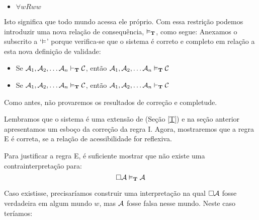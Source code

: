 \begin{itemize}
	\item $\forall wRww$
\end{itemize}
Isto significa que todo mundo acessa ele próprio.  Com   essa restrição podemos introduzir uma nova relação de consequência, $\vDash_{\mathbf{T}}$, como segue:
Anexamos o subscrito \mlT{}  a `$\vDash$' porque verifica-se que o sistema \mlT{} é correto e completo em relação a esta nova definição de validade:
\begin{itemize}
	\item Se $\mathcal{A}_1,\mathcal{A}_2, \dots \mathcal{A}_n\vdash_{\mathbf{T}}\mathcal{C}$, então $\mathcal{A}_1,\mathcal{A}_2, \dots \mathcal{A}_n\vDash_{\mathbf{T}}\mathcal{C}$
	\item Se $\mathcal{A}_1,\mathcal{A}_2, \dots \mathcal{A}_n\vDash_{\mathbf{T}}\mathcal{C}$, então $\mathcal{A}_1,\mathcal{A}_2, \dots \mathcal{A}_n\vdash_{\mathbf{T}}\mathcal{C}$
\end{itemize}
Como antes, não provaremos os resultados de correção e completude. 

Lembramos que o sistema \mlT{} é uma extensão de \mlK{} (Seção \ref{T})  e na seção anterior apresentamos um esboço da correção da  regra \ebox I.  Agora, mostraremos  que a regra  \ebox E é correta, se a relação de acessibilidade for reflexiva.  

Para justificar a regra \ebox E, é suficiente mostrar que não existe uma  contrainterpretação para:
\[
	\Box \mathcal{A}\vDash_{\mathbf{T}} \mathcal{A}
\]
 
 Caso existisse,  precisaríamos construir  uma interpretação  na qual $\Box \mathcal{A}$ fosse verdadeira em algum  mundo  $w$, mas $\mathcal{A}$ fosse falsa nesse mundo.  Neste caso teríamos:

